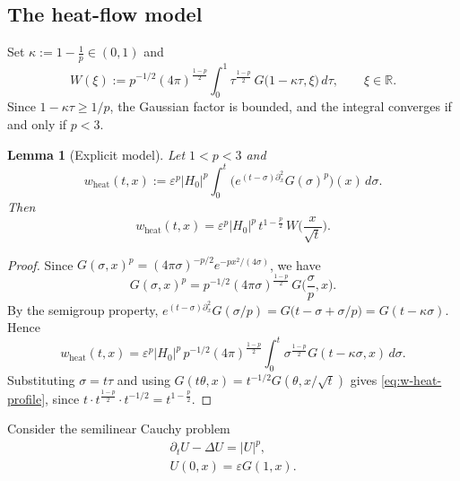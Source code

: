 \documentclass[11pt]{amsart}
\newtheorem{lemma}{Lemma}[section]
\theoremstyle{definition}
\theoremstyle{remark}
\numberwithin{equation}{section}
\newcommand{\R}{{\mathbb R}}
\newcommand{\pt}{\partial}
\newcommand{\ep}{\varepsilon}
\begin{document}
\subsection{The heat-flow model}

Set $\kappa:=1-\frac1p\in(0,1)$ and
\begin{equation}\label{eq:def-W}
W(\xi):=p^{-1/2}(4\pi)^{\frac{1-p}{2}}
\int_0^1\tau^{\frac{1-p}{2}}\,G\bigl(1-\kappa\tau,\xi\bigr)\,d\tau ,
\qquad \xi\in\R .
\end{equation}
Since $1-\kappa\tau\ge 1/p$, the Gaussian factor is bounded, and the integral
converges if and only if $p<3$.

\begin{lemma}[Explicit model]\label{lem:model}
Let $1<p<3$ and
\[
w_{\mathrm{heat}}(t,x):=\ep^p|H_0|^p\int_0^t
\bigl(e^{(t-\sigma)\pt_x^2}G(\sigma)^p\bigr)(x)\,d\sigma .
\]
Then
\begin{equation}\label{eq:w-heat-profile}
w_{\mathrm{heat}}(t,x)=\ep^p|H_0|^p\,t^{1-\frac p2}\,W\!\Big(\frac{x}{\sqrt t}\Big).
\end{equation}
\end{lemma}

\begin{proof}
Since $G(\sigma,x)^p=(4\pi\sigma)^{-p/2}e^{-px^2/(4\sigma)}$, we have
\[
G(\sigma,x)^p=p^{-1/2}(4\pi\sigma)^{\frac{1-p}{2}}\,G\Big(\frac{\sigma}{p},x\Big).
\]
By the semigroup property,
$e^{(t-\sigma)\pt_x^2}G(\sigma/p)=G\bigl(t-\sigma+\sigma/p\bigr)=G(t-\kappa\sigma)$.
Hence
\[
w_{\mathrm{heat}}(t,x)=\ep^p|H_0|^p\,p^{-1/2}(4\pi)^{\frac{1-p}{2}}
\int_0^t\sigma^{\frac{1-p}{2}}G(t-\kappa\sigma,x)\,d\sigma .
\]
Substituting $\sigma=t\tau$ and using
$G(t\theta,x)=t^{-1/2}G(\theta,x/\sqrt t)$ gives
\eqref{eq:w-heat-profile}, since
$t\cdot t^{\frac{1-p}{2}}\cdot t^{-1/2}=t^{1-\frac p2}$.
\end{proof}

Consider the semilinear Cauchy problem
\begin{equation}
\begin{aligned}
    \partial_t U - \Delta U = |U|^p, \\
    U(0,x) = \varepsilon G(1,x).
\end{aligned}
\end{equation}
\end{document}
